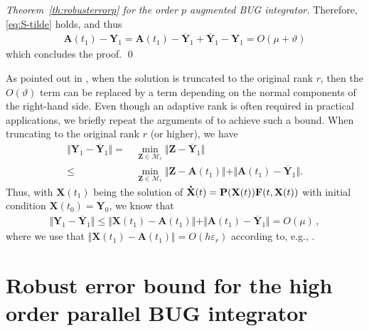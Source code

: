 \documentclass[preprint,runningheads]{svjour3}
\newcommand*{\dt}[1]{ \accentset{\mbox{\large\bfseries .}}{#1}}
\def\wt{\widetilde}
\def\wt{\overline}
\newcommand\bfA{{\mathbf A}}
\newcommand\bfF{{\mathbf F}}
\newcommand\bfP{{\mathbf P}}
\newcommand\bfX{{\mathbf X}}
\newcommand\bfY{{\mathbf Y}}
\newcommand\bfZ{{\mathbf Z}}
\begin{document}
\begin{proof}[Theorem~\ref{th:robusterrorp} for the order $p$ augmented BUG integrator]
		Therefore, \eqref{eq:S-tilde} holds, and thus
        \begin{align*}
            \bfA(t_1) - \bfY_1 = \bfA(t_1) - \wt\bfY_1 + \wt\bfY_1 - \bfY_1 = O(\mu + \vartheta)
        \end{align*}
        which concludes the proof. 
\qed
\end{proof}

\begin{remark}\label{re:heps-truncation}
    As pointed out in \cite{nobile2025robust}, when the solution is truncated to the original rank $r$, then the $O(\vartheta)$ term can be replaced by a term depending on the normal components of the right-hand side. Even though an adaptive rank is often required in practical applications, we briefly repeat the arguments of \cite[Lemma~3]{KiV19} to achieve such a bound. When truncating to the original rank $r$ (or higher), we have
    \begin{align*}
        \Vert \bfY_1 - \wt\bfY_1\Vert =\,& \min_{\bfZ\in\mathcal{M}_{r}} \Vert \bfZ - \wt\bfY_1\Vert\\
        \leq\,& \min_{\bfZ\in\mathcal{M}_{r}} \Vert \bfZ - \bfA(t_1) \Vert + \Vert \bfA(t_1) - \wt\bfY_1\Vert.
    \end{align*}
    Thus, with $\bfX(t_1)$ being the solution of $\dt{\bfX}(t) = \bfP(\bfX(t))\bfF(t, \bfX(t))$ with initial condition $\bfX(t_0) = \bfY_0$, we know that
    \begin{align*}
        \Vert \bfY_1 - \wt\bfY_1\Vert \leq \Vert \bfX(t_1) - \bfA(t_1) \Vert + \Vert \bfA(t_1) - \wt\bfY_1\Vert = O(\mu)\,,
    \end{align*}
    where we use that $\Vert \bfX(t_1) - \bfA(t_1) \Vert = O(h\varepsilon_{r})$ according to, e.g., \cite[Lemma~1]{KiV19}.
\end{remark}

\section{Robust error bound for the high order parallel BUG integrator}\label{sec:error_bound_pbug}
\end{document}
